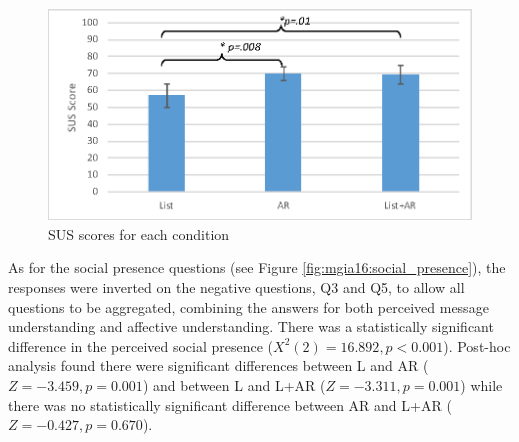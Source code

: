 \begin{figure}[h]
  \centering
  \includegraphics[width=0.8\linewidth]{images/mgia16/sus2.eps}
  \caption{SUS scores for each condition}
  \label{fig:mgia16:questions_sus}
\end{figure}

As for the social presence questions (see Figure \ref{fig:mgia16:social_presence}), the responses were inverted on the negative questions, Q3 and Q5, to allow all questions to be aggregated, combining the answers for both perceived message understanding and affective understanding. There was a statistically significant difference in the perceived social presence ($X^2(2)=16.892, p<0.001$). Post-hoc analysis found there were significant differences between L and AR ($Z=-3.459, p=0.001$) and between L and L+AR ($Z=-3.311, p=0.001$) while there was no statistically significant difference between AR and L+AR ($Z=-0.427, p=0.670$). 




